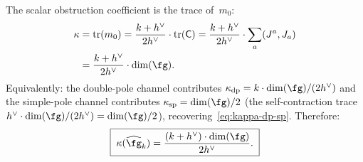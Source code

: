 \begin{computation}[First-principles derivation of
$\kappa(\widehat{\fg}_k) = \dim(\fg)(k+h^\vee)/(2h^\vee)$]
The scalar obstruction coefficient is the trace
of~$m_0$:
\begin{align}
\kappa
&= \operatorname{tr}(m_0)
= \frac{k + h^\vee}{2h^\vee}
 \cdot \operatorname{tr}(\mathsf{C})
= \frac{k + h^\vee}{2h^\vee}
 \cdot \sum_a (J^a, J_a)
\notag \\
&= \frac{k + h^\vee}{2h^\vee}\cdot\dim(\fg).
\label{eq:km-dfib-squared-trace}
\end{align}
Equivalently: the double-pole channel contributes
$\kappa_{\mathrm{dp}} = k\cdot\dim(\fg)/(2h^\vee)$
and the simple-pole channel contributes
$\kappa_{\mathrm{sp}} = \dim(\fg)/2$
(the self-contraction trace
$h^\vee\cdot\dim(\fg)/(2h^\vee) = \dim(\fg)/2$),
recovering~\eqref{eq:kappa-dp-sp}. Therefore:
\begin{equation}\label{eq:km-kappa-derivation}
\boxed{\;\kappa(\widehat{\fg}_k)
= \frac{(k + h^\vee)\cdot\dim(\fg)}{2h^\vee}.\;}
\end{equation}


\end{computation}
